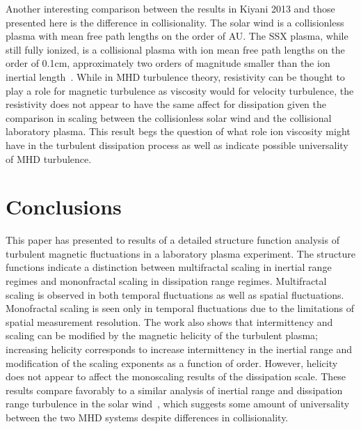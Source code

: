 \documentclass[preprint2]{aastex}
\begin{document}
Another interesting comparison between the results in Kiyani 2013 and those presented here is the difference in collisionality. The solar wind is a collisionless plasma with mean free path lengths on the order of AU. The SSX plasma, while still fully ionized, is a collisional plasma with ion mean free path lengths on the order of 0.1cm, approximately two orders of magnitude smaller than the ion inertial length~\citep{schaffner2014c}. While in MHD turbulence theory, resistivity can be thought to play a role for magnetic turbulence as viscosity would for velocity turbulence, the resistivity does not appear to have the same affect for dissipation given the comparison in scaling between the collisionless solar wind and the collisional laboratory plasma. This result begs the question of what role ion viscosity might have in the turbulent dissipation process as well as indicate possible universality of MHD turbulence.

\section{Conclusions}\label{sec:conclusions}

This paper has presented to results of a detailed structure function analysis of turbulent magnetic fluctuations in a laboratory plasma experiment. The structure functions indicate a distinction between multifractal scaling in inertial range regimes and mononfractal scaling in dissipation range regimes. Multifractal scaling is observed in both temporal fluctuations as well as spatial fluctuations. Monofractal scaling is seen only in temporal fluctuations due to the limitations of spatial measurement resolution. The work also shows that intermittency and scaling can be modified by the magnetic helicity of the turbulent plasma; increasing helicity corresponds to increase intermittency in the inertial range and modification of the scaling exponents as a function of order. However, helicity does not appear to affect the monoscaling results of the dissipation scale. These results compare favorably to a similar analysis of inertial range and dissipation range turbulence in the solar wind~\citep{kiyani2013}, which suggests some amount of universality between the two MHD systems despite differences in collisionality.
\end{document}
